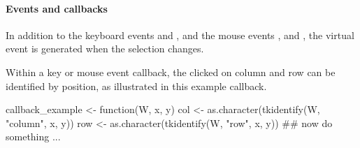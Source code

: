 
\paragraph{Events and callbacks}
In addition to the keyboard events  and
, and the mouse events ,
 and , the virtual event
 is generated when the selection changes.

Within a key or mouse event callback, the clicked on column and row can
be identified by position, as illustrated in this example callback.
\begin{Schunk}
\begin{Sinput}
 callback_example <- function(W, x, y) {
   col <- as.character(tkidentify(W, "column", x, y))
   row <- as.character(tkidentify(W, "row", x, y))
   ## now do something ...
 }
\end{Sinput}
\end{Schunk}



